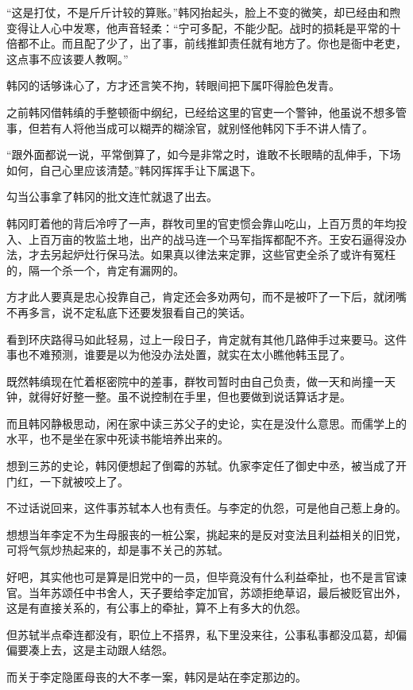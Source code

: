 “这是打仗，不是斤斤计较的算账。”韩冈抬起头，脸上不变的微笑，却已经由和煦变得让人心中发寒，他声音轻柔：“宁可多配，不能少配。战时的损耗是平常的十倍都不止。而且配了少了，出了事，前线推卸责任就有地方了。你也是衙中老吏，这点事不应该要人教啊。”

韩冈的话够诛心了，方才还言笑不拘，转眼间把下属吓得脸色发青。

之前韩冈借韩缜的手整顿衙中纲纪，已经给这里的官吏一个警钟，他虽说不想多管事，但若有人将他当成可以糊弄的糊涂官，就别怪他韩冈下手不讲人情了。

“跟外面都说一说，平常倒算了，如今是非常之时，谁敢不长眼睛的乱伸手，下场如何，自己心里应该清楚。”韩冈挥挥手让下属退下。

勾当公事拿了韩冈的批文连忙就退了出去。

韩冈盯着他的背后冷哼了一声，群牧司里的官吏惯会靠山吃山，上百万贯的年均投入、上百万亩的牧监土地，出产的战马连一个马军指挥都配不齐。王安石逼得没办法，才去另起炉灶行保马法。如果真以律法来定罪，这些官吏全杀了或许有冤枉的，隔一个杀一个，肯定有漏网的。

方才此人要真是忠心投靠自己，肯定还会多劝两句，而不是被吓了一下后，就闭嘴不再多言，说不定私底下还要发狠看自己的笑话。

看到环庆路得马如此轻易，过上一段日子，肯定就有其他几路伸手过来要马。这件事也不难预测，谁要是以为他没办法处置，就实在太小瞧他韩玉昆了。

既然韩缜现在忙着枢密院中的差事，群牧司暂时由自己负责，做一天和尚撞一天钟，就得好好整一整。虽不说控制在手里，但也要做到说话算话才是。

而且韩冈静极思动，闲在家中读三苏父子的史论，实在是没什么意思。而儒学上的水平，也不是坐在家中死读书能培养出来的。

想到三苏的史论，韩冈便想起了倒霉的苏轼。仇家李定任了御史中丞，被当成了开门红，一下就被咬上了。

不过话说回来，这件事苏轼本人也有责任。与李定的仇怨，可是他自己惹上身的。

想想当年李定不为生母服丧的一桩公案，挑起来的是反对变法且利益相关的旧党，可将气氛炒热起来的，却是事不关己的苏轼。

好吧，其实他也可是算是旧党中的一员，但毕竟没有什么利益牵扯，也不是言官谏官。当年苏颂任中书舍人，天子要给李定加官，苏颂拒绝草诏，最后被贬官出外，这是有直接关系的，有公事上的牵扯，算不上有多大的仇怨。

但苏轼半点牵连都没有，职位上不搭界，私下里没来往，公事私事都没瓜葛，却偏偏要凑上去，这是主动跟人结怨。

而关于李定隐匿母丧的大不孝一案，韩冈是站在李定那边的。


